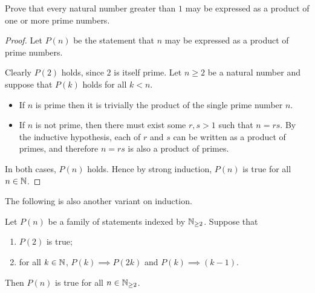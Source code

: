 \begin{example}
Prove that every natural number greater than $1$ may be expressed as a product of one or more prime numbers.

\begin{proof}
Let $P(n)$ be the statement that $n$ may be expressed as a product of prime numbers. 

Clearly $P(2)$ holds, since $2$ is itself prime. Let $n\ge 2$ be a natural number and suppose that $P(k)$ holds for all $k<n$.

\begin{itemize}
\item If $n$ is prime then it is trivially the product of the single prime number $n$. 

\item If $n$ is not prime, then there must exist some $r, s > 1$ such that $n = rs$. By the inductive hypothesis, each of $r$ and $s$ can be written as a product of primes, and therefore $n = rs$ is also a product of primes.
\end{itemize}

In both cases, $P(n)$ holds. Hence by strong induction, $P(n)$ is true for all $n\in\mathbb N$.
\end{proof}
\end{example}

The following is also another variant on induction.

\begin{theorem}
Let $P(n)$ be a family of statements indexed by $\mathbb N_{\ge2}$. Suppose that
\begin{enumerate}[label=(\roman*)]
\item $P(2)$ is true;
\item for all $k\in\mathbb N$, $P(k)\implies P(2k)$ and $P(k)\implies (k-1)$.
\end{enumerate}
Then $P(n)$ is true for all $n\in\mathbb N_{\ge2}$.
\end{theorem}

